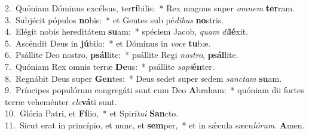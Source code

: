 {2.~}Quóniam Dóminus excélsus, ter\textbf{rí}bilis:~* Rex magnus super \textit{om}\textit{nem} \textbf{ter}ram.\\
{3.~}Subjécit pópulos \textbf{no}bis:~* et Gentes sub pé\textit{di}\textit{bus} \textbf{no}stris.\\
{4.~}Elégit nobis hereditátem \textbf{su}am:~* spéciem Jacob, \textit{quam} \textit{di}\textbf{lé}xit.\\
{5.~}Ascéndit Deus in \textbf{jú}bilo:~* et Dóminus in \textit{vo}\textit{ce} \textbf{tu}bæ.\\
{6.~}Psállite Deo nostro, \textbf{psál}lite:~* psállite Regi \textit{no}\textit{stro}, \textbf{psál}lite.\\
{7.~}Quóniam Rex omnis terræ \textbf{De}us:~* psállite \textit{sa}\textit{pi}\textbf{én}ter.\\
{8.~}Regnábit Deus super \textbf{Gen}tes:~* Deus sedet super sedem \textit{san}\textit{ctam} \textbf{su}am.\\
{9.~}Príncipes populórum congregáti sunt cum Deo \textbf{A}braham:~* quóniam dii fortes terræ veheménter \textit{e}\textit{le}\textbf{vá}ti sunt.\\
{10.~}Glória Patri, et \textbf{Fí}lio,~* et Spirí\textit{tu}\textit{i} \textbf{San}cto.\\
{11.~}Sicut erat in princípio, et nunc, et \textbf{sem}per,~* et in sǽcula sæcu\textit{ló}\textit{rum}. \textbf{A}men.\\
